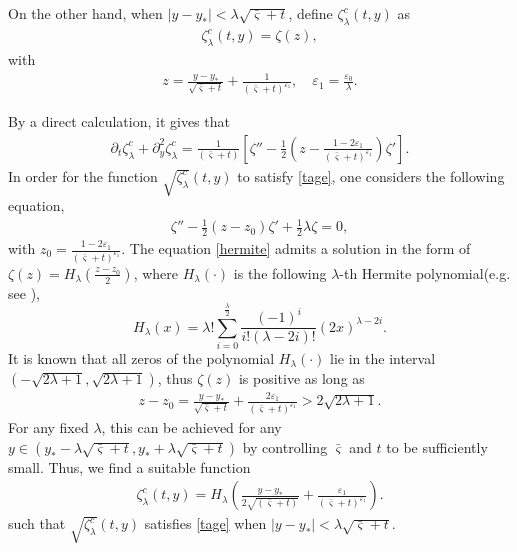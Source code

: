 \documentclass{amsart}
\numberwithin{equation}{section}
\begin{document}
On the other hand, when $|y-y_{*}|< \lambda\sqrt{\bar{\varsigma}+t}$, define  $\zeta_{\lambda}^{c}(t,y)$ as
\begin{align*}
\zeta_{\lambda}^{c}(t,y)=\zeta(z),
\end{align*}
with
\begin{align*}
z=\frac{y-y_{*}}{\sqrt{\bar{\varsigma}+t}}+\frac{1}{(\bar{\varsigma}+t)^{\varepsilon_{1}}}, \quad
\varepsilon_{1}=\frac{\varepsilon_{0}}{\lambda}.
\end{align*}


By a direct calculation, it gives that
\begin{align}\label{zetae}
\partial_{t}\zeta_\lambda^{c}+\partial_{y}^{2}\zeta_\lambda^{c}
=\frac{1}{(\bar{\varsigma}+t)}\left[\zeta''-\frac{1}{2}\left(z-\frac{1-2\varepsilon_{1}}{(\bar{\varsigma}+t)^{\varepsilon_{1}}}\right)\zeta'\right].
\end{align}
 In order for the function $\sqrt{\zeta^{c}_\lambda}(t,y)$ to satisfy \eqref{tage}, one considers the following equation,
\begin{align}\label{hermite}
\zeta''-\frac{1}{2}(z-z_{0})\zeta'+\frac{1}{2}\lambda\zeta=0,
\end{align}
with $z_{0}=\frac{1-2\varepsilon_{1}}{(\bar{\varsigma}+t)^{\varepsilon_{1}}}$. The  equation \eqref{hermite} admits a solution in the form of $\zeta(z)=H_{\lambda}(\frac{z-z_{0}}{2})$, where $H_{\lambda}(\cdot)$ is the following $\lambda$-th Hermite polynomial(e.g. see \cite{Sz}),
$$
H_{\lambda}(x)=\lambda!\sum_{i=0}^{\frac{\lambda}{2}}\frac{(-1)^{i}}{i!(\lambda-2i)!}(2x)^{\lambda-2i}.
$$
It is known that all zeros of the polynomial $H_{\lambda}(\cdot)$ lie in the interval $(-\sqrt{2\lambda+1},\sqrt{2\lambda+1})$, thus $\zeta(z)$ is positive as long as \begin{align*}
z-z_{0}=\frac{y-y_{*}}{\sqrt{\bar{\varsigma}+t}}+\frac{2\varepsilon_{1}}{(\bar{\varsigma}+t)^{\varepsilon_{1}}}>2\sqrt{2\lambda+1}.
\end{align*}
For any fixed $\lambda$, this can be achieved for any $y\in(y_{*}-\lambda\sqrt{\bar{\varsigma}+t},y_{*}+\lambda\sqrt{\bar{\varsigma}+t})$ by controlling $\bar{\varsigma}$ and $t$ to be sufficiently small. Thus, we find a suitable function
\begin{align}\label{zetac}
\zeta_{\lambda}^{c}(t,y)
=H_{\lambda}\left(\frac{y-y_{*}}{2\sqrt{(\bar{\varsigma}+t)}}+\frac{\varepsilon_{1}}{(\bar{\varsigma}+t)^{\varepsilon_{1}}}\right).
\end{align}
such that $\sqrt{\zeta_{\lambda}^{c}}(t,y)$ satisfies \eqref{tage}
when $|y-y_{*}|< \lambda\sqrt{\bar{\varsigma}+t}$.
\end{document}
